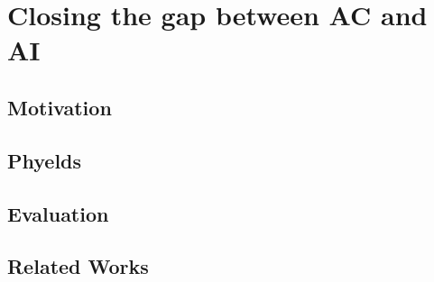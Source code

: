 
\chapter{Closing the gap between AC and AI}
\label{chap:phyelds}
\minitoc
\section{Motivation}
\section{Phyelds}
\section{Evaluation}
\section{Related Works}